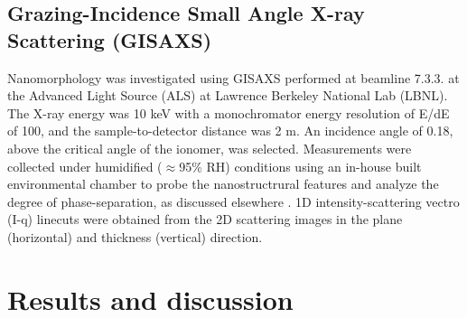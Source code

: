 \documentclass[journal=jacsat,manuscript=article]{achemso}
\begin{document}
\subsection{Grazing-Incidence Small Angle X-ray Scattering (GISAXS)}
Nanomorphology was investigated using GISAXS performed at beamline 7.3.3. at the Advanced Light Source (ALS) at Lawrence Berkeley National Lab (LBNL). The X-ray energy was 10 keV with a monochromator energy resolution of E/dE of 100, and the sample-to-detector distance was 2 m. An incidence angle of 0.18, above the critical angle of the ionomer, was selected. Measurements were collected under humidified ($\approx$95\% RH) conditions using an in-house built environmental chamber to probe the nanostructrural features and analyze the degree of phase-separation, as discussed elsewhere \cite{bird_modulating_nodate,luo_anion_2021,chowdhury_linking_2021}. 1D intensity-scattering vectro (I-q) linecuts were obtained from the 2D scattering images in the plane (horizontal) and thickness (vertical) direction. 

\section{Results and discussion}
\end{document}
